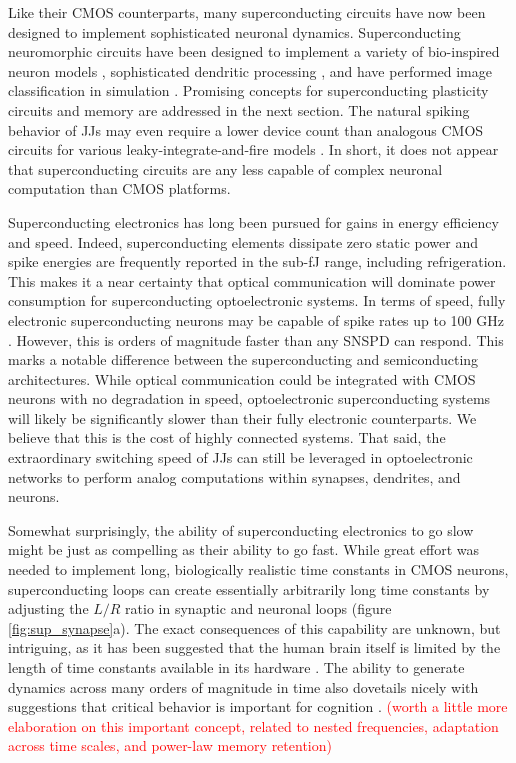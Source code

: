 \documentclass[twocolumn]{article}
\begin{document}
Like their CMOS counterparts, many superconducting circuits have now been designed to implement sophisticated neuronal dynamics. Superconducting neuromorphic circuits have been designed to implement a variety of bio-inspired neuron models \cite{crotty2010josephson, toomey2019design, schneider2018tutorial}, sophisticated dendritic processing \cite{shainline2019fluxonic}, and have performed image classification in simulation \cite{schneider2017energy}. Promising concepts for superconducting plasticity circuits and memory are addressed in the next section. The natural spiking behavior of JJs may even require a lower device count than analogous CMOS circuits for various leaky-integrate-and-fire models \cite{crotty2010josephson}. In short, it does not appear that superconducting circuits are any less capable of complex neuronal computation than CMOS platforms.

Superconducting electronics has long been pursued for gains in energy efficiency and speed. Indeed, superconducting elements dissipate zero static power and spike energies are frequently reported in the sub-fJ range, including refrigeration. This makes it a near certainty that optical communication will dominate power consumption for superconducting optoelectronic systems. In terms of speed, fully electronic superconducting neurons may be capable of spike rates up to 100 GHz \cite{schneider2018tutorial, schneider2017energy}. However, this is orders of magnitude faster than any SNSPD can respond. This marks a notable difference between the superconducting and semiconducting architectures. While optical communication could be integrated with CMOS neurons with no degradation in speed, optoelectronic superconducting systems will likely be significantly slower than their fully electronic counterparts. We believe that this is the cost of highly connected systems. That said, the extraordinary switching speed of JJs can still be leveraged in optoelectronic networks to perform analog computations within synapses, dendrites, and neurons.

Somewhat surprisingly, the ability of superconducting electronics to go slow might be just as compelling as their ability to go fast. While great effort was needed to implement long, biologically realistic time constants in CMOS neurons, superconducting loops can create essentially arbitrarily long time constants by adjusting the $L/R$ ratio in synaptic and neuronal loops (figure \ref{fig:sup_synapse}a). The exact consequences of this capability are unknown, but intriguing, as it has been suggested that the human brain itself is limited by the length of time constants available in its hardware \cite{indiveri2019importance}. The ability to generate dynamics across many orders of magnitude in time also dovetails nicely with suggestions that critical behavior is important for cognition \cite{cocchi2017criticality}. \textcolor{red}{(worth a little more elaboration on this important concept, related to nested frequencies, adaptation across time scales, and power-law memory retention)}
\end{document}
